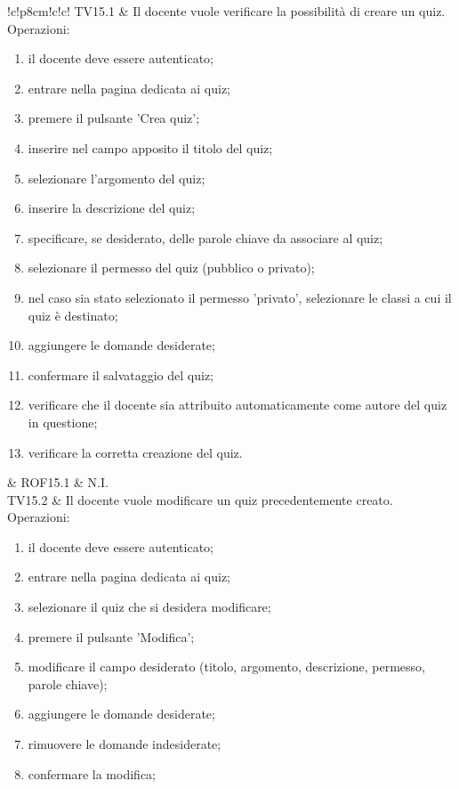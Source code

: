 \documentclass[a4paper, titlepage]{article}
\begin{document}
\begin{tabella}{!{\VRule}c!{\VRule}p{8cm}!{\VRule}c!{\VRule}c!{\VRule}}
	TV15.1 &
		Il docente vuole verificare la possibilità di creare un quiz.
		\newline \newline
		Operazioni:
		{\begin{enumerate}
				\item il docente deve essere autenticato;
				\item entrare nella pagina dedicata ai quiz;
				\item premere il pulsante 'Crea quiz';
				\item inserire nel campo apposito il titolo del quiz;
				\item selezionare l’argomento del quiz;
				\item inserire la descrizione del quiz;
				\item specificare, se desiderato, delle parole chiave da associare al quiz;
				\item selezionare il permesso del quiz (pubblico o privato);
				\item nel caso sia stato selezionato il permesso 'privato', selezionare le classi a cui il quiz è destinato;
				\item aggiungere le domande desiderate;
				\item confermare il salvataggio del quiz;
				\item verificare che il docente sia attribuito automaticamente come autore del quiz in questione;
				\item verificare la corretta creazione del quiz.
		\end{enumerate}
		}
	& ROF15.1 & N.I.
	\\
	TV15.2 &
		Il docente vuole modificare un quiz precedentemente creato.
		\newline \newline
		Operazioni:
		{\begin{enumerate}
				\item il docente deve essere autenticato;
				\item entrare nella pagina dedicata ai quiz;
				\item selezionare il quiz che si desidera modificare;
				\item premere il pulsante 'Modifica';
				\item modificare il campo desiderato (titolo, argomento, descrizione, permesso, parole chiave);
				\item aggiungere le domande desiderate;
				\item rimuovere le domande indesiderate;
				\item confermare la modifica;

\end{enumerate}}
\end{tabella}
\end{document}
